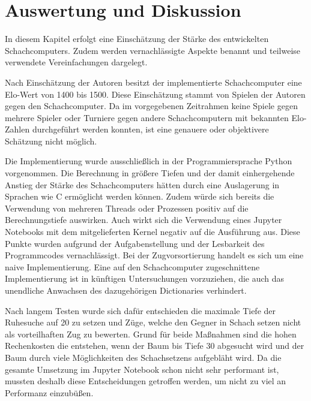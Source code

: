 \section{Auswertung und Diskussion} \label{ch:evaluation-discussion}

In diesem Kapitel erfolgt eine Einschätzung der Stärke des entwickelten Schachcomputers.
Zudem werden vernachlässigte Aspekte benannt und teilweise verwendete Vereinfachungen dargelegt.

Nach Einschätzung der Autoren besitzt der implementierte Schachcomputer eine Elo-Wert von 1400 bis 1500.
Diese Einschätzung stammt von Spielen der Autoren gegen den Schachcomputer.
Da im vorgegebenen Zeitrahmen keine Spiele gegen mehrere Spieler oder Turniere gegen andere Schachcomputern mit bekannten Elo-Zahlen durchgeführt werden konnten, ist eine genauere oder objektivere Schätzung nicht möglich.

Die Implementierung wurde ausschließlich in der Programmiersprache Python vorgenommen.
Die Berechnung in größere Tiefen und der damit einhergehende Anstieg der Stärke des Schachcomputers hätten durch eine Auslagerung in Sprachen wie C ermöglicht werden können.
Zudem würde sich bereits die Verwendung von mehreren Threads oder Prozessen positiv auf die Berechnungstiefe auswirken.
Auch wirkt sich die Verwendung eines Jupyter Notebooks mit dem mitgelieferten Kernel negativ auf die Ausführung aus.
Diese Punkte wurden aufgrund der Aufgabenstellung und der Lesbarkeit des Programmcodes vernachlässigt.
Bei der Zugvorsortierung handelt es sich um eine naive Implementierung.
Eine auf den Schachcomputer zugeschnittene Implementierung ist in künftigen Untersuchungen vorzuziehen, die auch das unendliche Anwachsen des dazugehörigen Dictionaries verhindert.

Nach langem Testen wurde sich dafür entschieden die maximale Tiefe der Ruhesuche auf 20 zu setzen und Züge, welche den Gegner in Schach setzen nicht als vorteilhaften Zug zu bewerten.
Grund für beide Maßnahmen sind die hohen Rechenkosten die entstehen, wenn der Baum bis Tiefe 30 abgesucht wird und der Baum durch viele Möglichkeiten des Schachsetzens aufgebläht wird.
Da die gesamte Umsetzung im Jupyter Notebook schon nicht sehr performant ist, mussten deshalb diese Entscheidungen getroffen werden, um nicht zu viel an Performanz einzubüßen.
